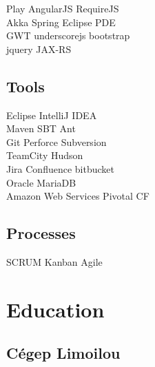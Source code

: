 \documentclass[letterpaper]{deedy-resume} %
\begin{document}
\begin{minipage}[t]{0.33\textwidth}
Play \textbullet{} AngularJS \textbullet{} RequireJS \\
Akka \textbullet{} Spring \textbullet{} Eclipse PDE \\
GWT \textbullet{} underscorejs \textbullet{} bootstrap \\
jquery \textbullet{} JAX-RS

\sectionspace %

\subsection{Tools}

Eclipse \textbullet{} IntelliJ IDEA \\
Maven \textbullet{} SBT \textbullet{} Ant \\
Git \textbullet{} Perforce \textbullet{} Subversion \\
TeamCity \textbullet{} Hudson \\
Jira \textbullet{} Confluence \textbullet{} bitbucket \\
Oracle \textbullet{} MariaDB \\
Amazon Web Services \textbullet{} Pivotal CF

\sectionspace %

\subsection{Processes}
SCRUM \textbullet{} Kanban \textbullet{} Agile

\sectionspace %


\section{Education} 

\subsection{Cégep Limoilou}


\sectionspace %



\end{minipage}
\end{document}
